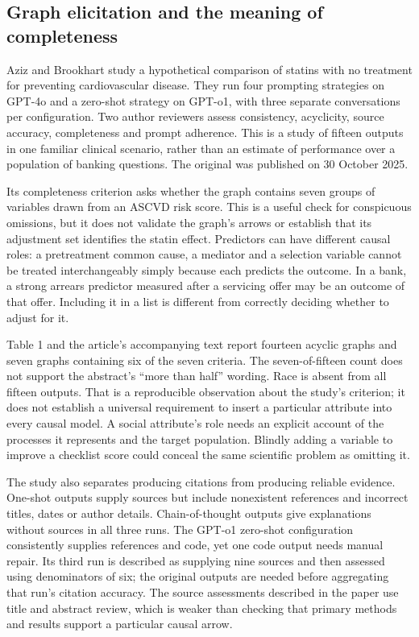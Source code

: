 \subsection{Graph elicitation and the meaning of completeness}
\label{exec22:domain-elicitation}

Aziz and Brookhart study a hypothetical comparison of statins with no treatment
for preventing cardiovascular disease. They run four prompting strategies on
GPT-4o and a zero-shot strategy on GPT-o1, with three separate conversations per
configuration. Two author reviewers assess consistency, acyclicity, source
accuracy, completeness and prompt adherence. This is a study of fifteen outputs
in one familiar clinical scenario, rather than an estimate of performance over
a population of banking questions. The original was published on 30 October
2025. \citep{exec22_domain_aziz}

Its completeness criterion asks whether the graph contains seven groups of
variables drawn from an ASCVD risk score. This is a useful check for conspicuous
omissions, but it does not validate the graph's arrows or establish that its
adjustment set identifies the statin effect. Predictors can have different causal
roles: a pretreatment common cause, a mediator and a selection variable cannot
be treated interchangeably simply because each predicts the outcome. In a bank,
a strong arrears predictor measured after a servicing offer may be an outcome
of that offer. Including it in a list is different from correctly deciding
whether to adjust for it.

Table 1 and the article's accompanying text report fourteen acyclic graphs and
seven graphs containing six of the seven criteria. The seven-of-fifteen count
does not support the abstract's ``more than half'' wording. Race is absent from
all fifteen outputs. That is a reproducible observation about the study's
criterion; it does not establish a universal requirement to insert a particular
attribute into every causal model. A social attribute's role needs an explicit
account of the processes it represents and the target population. Blindly
adding a variable to improve a checklist score could conceal the same scientific
problem as omitting it. \citep{exec22_domain_aziz,exec22_domain_reference}

The study also separates producing citations from producing reliable evidence.
One-shot outputs supply sources but include nonexistent references and incorrect
titles, dates or author details. Chain-of-thought outputs give explanations
without sources in all three runs. The GPT-o1 zero-shot configuration consistently
supplies references and code, yet one code output needs manual repair. Its third
run is described as supplying nine sources and then assessed using denominators
of six; the original outputs are needed before aggregating that run's citation
accuracy. The source assessments described in the paper use title and abstract
review, which is weaker than checking that primary methods and results support
a particular causal arrow. \citep{exec22_domain_aziz}

